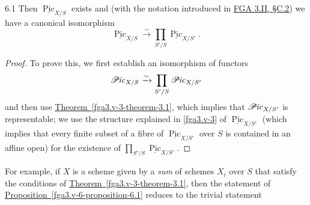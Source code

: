 \begin{proposition}{6.1}
    Then \(\underline {\operatorname {Pic}}_{X/S}\) exists and (with the notation introduced in \hyperref[fga3.ii-c.2]{FGA 3.II, §C.2}) we have a canonical isomorphism
    \[       \underline {\operatorname {Pic}}_{X/S}       \xrightarrow {\sim } \prod _{S'/S} \underline {\operatorname {Pic}}_{X/S'}.     \]\begin{proof}\par{}To prove this, we first establish an isomorphism of functors
      \[         \mathscr {P}\kern  -1pt\mathit {ic}_{X/S}         \xrightarrow {\sim } \prod _{S'/S} \mathscr {P}\kern  -1pt\mathit {ic}_{X/S'}       \]
      and then use \hyperref[fga3.v-3-theorem-3.1]{Theorem~\ref*{fga3.v-3-theorem-3.1}}, which implies that \(\mathscr {P}\kern  -1pt\mathit {ic}_{X/S'}\) is representable;
      we use the structure explained in \cref{fga3.v-3} of \(\underline {\operatorname {Pic}}_{X/S'}\) (which implies that every finite subset of a fibre of \(\underline {\operatorname {Pic}}_{X/S'}\) over \(S\) is contained in an affine open) for the existence of \(\prod _{S'/S}\underline {\operatorname {Pic}}_{X/S'}\).\end{proof}\end{proposition}\par{}For example, if \(X\) is a scheme given by a \emph{sum} of schemes \(X_i\) over \(S\) that satisfy the conditions of \hyperref[fga3.v-3-theorem-3.1]{Theorem~\ref*{fga3.v-3-theorem-3.1}}, then the statement of \hyperref[fga3.v-6-proposition-6.1]{Proposition~\ref*{fga3.v-6-proposition-6.1}} reduces to the trivial statement
